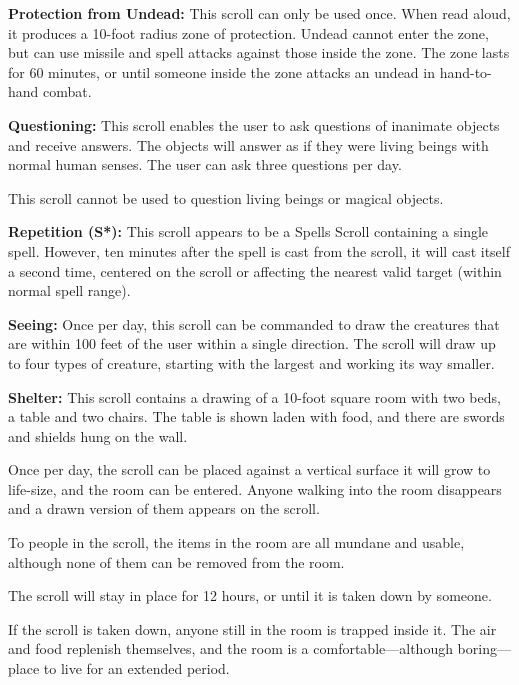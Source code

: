 \begin{multicols*}{2}
\textbf{Protection from Undead:} This scroll can only be used once. When read aloud, it produces a 10-foot radius zone of protection. Undead cannot enter the zone, but can use missile and spell attacks against those inside the zone. The zone lasts for 60 minutes, or until someone inside the zone attacks an undead in hand-to-hand combat.

\textbf{Questioning:} This scroll enables the user to ask questions of inanimate objects and receive answers. The objects will answer as if they were living beings with normal human senses. The user can ask three questions per day.

This scroll cannot be used to question living beings or magical objects.

\textbf{Repetition (S*):} This scroll appears to be a Spells Scroll containing a single spell. However, ten minutes after the spell is cast from the scroll, it will cast itself a second time, centered on the scroll or affecting the nearest valid target (within normal spell range).

\textbf{Seeing:} Once per day, this scroll can be commanded to draw the creatures that are within 100 feet of the user within a single direction. The scroll will draw up to four types of creature, starting with the largest and working its way smaller.

\textbf{Shelter:} This scroll contains a drawing of a 10-foot square room with two beds, a table and two chairs. The table is shown laden with food, and there are swords and shields hung on the wall.

Once per day, the scroll can be placed against a vertical surface it will grow to life-size, and the room can be entered. Anyone walking into the room disappears and a drawn version of them appears on the scroll.

To people in the scroll, the items in the room are all mundane and usable, although none of them can be removed from the room.

The scroll will stay in place for 12 hours, or until it is taken down by someone.

If the scroll is taken down, anyone still in the room is trapped inside it. The air and food replenish themselves, and the room is a comfortable—although boring—place to live for an extended period.


\end{multicols*}
